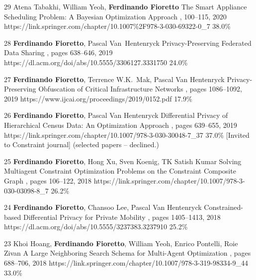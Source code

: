 \begin{pubs}
	\confentry
		{29} %
	    {Atena Tabakhi, William Yeoh, {\bf Ferdinando Fioretto}}
	    {The Smart Appliance Scheduling Problem: A Bayesian Optimization Approach}
	    {\procPRIMA, 100--115, 2020}
	    {https://link.springer.com/chapter/10.1007\%2F978-3-030-69322-0\_7}
	    {38.0\%} %

	\confentry
		{28} %
		{{\bf Ferdinando Fioretto}, Pascal Van~Hentenryck}
		{Privacy-Preserving Federated Data Sharing}
	  	{\procAAMAS, pages 638--646, 2019}
	  	{https://dl.acm.org/doi/abs/10.5555/3306127.3331750}
		{24.0\%} %

	\confentry
		{27} %
		{{\bf Ferdinando Fioretto}, Terrence W.K.~Mak, Pascal Van Hentenryck}
		{Privacy-Preserving Obfuscation of Critical Infrastructure Networks}
	  	{\procIJCAI, pages 1086--1092, 2019}
	  	{https://www.ijcai.org/proceedings/2019/0152.pdf}
	    {17.9\%} %

	\confentryAwd
		{26} %
		{{\bf Ferdinando Fioretto}, Pascal Van Hentenryck}
		{Differential Privacy of Hierarchical Census Data: An Optimization Approach} 
		{\procCP, pages 639--655, 2019}
		{https://link.springer.com/chapter/10.1007/978-3-030-30048-7\_37}
		{37.0\%}
		{[Invited to Constraint journal]}
		{(selected papers -- declined.)}

	\confentry 
		{25} %
		{{\bf Ferdinando Fioretto}, Hong Xu, Sven Koenig, TK Satish Kumar}
	 	{Solving Multiagent Constraint Optimization Problems on the Constraint Composite Graph}
		{\procPRIMA, pages 106--122, 2018}
		{https://link.springer.com/chapter/10.1007/978-3-030-03098-8\_7}
	    {26.2\%} %

	\confentry
		{24} %
	  	{{\bf Ferdinando Fioretto}, Chansoo Lee, Pascal Van Hentenryck}
	  	{Constrained-based Differential Privacy for Private Mobility} 
	  	{\procAAMAS, pages 1405--1413, 2018}
	  	{https://dl.acm.org/doi/abs/10.5555/3237383.3237910}
	    {25.2\%} %

	\confentry 
		{23} %
		{Khoi Hoang, {\bf Ferdinando Fioretto}, William Yeoh, Enrico Pontelli, Roie Zivan}
		{A Large Neighboring Search Schema for Multi-Agent Optimization}
		{\procCP, pages 688--706, 2018}
		{https://link.springer.com/chapter/10.1007/978-3-319-98334-9\_44}
	    {33.0\%} %


\end{pubs}
